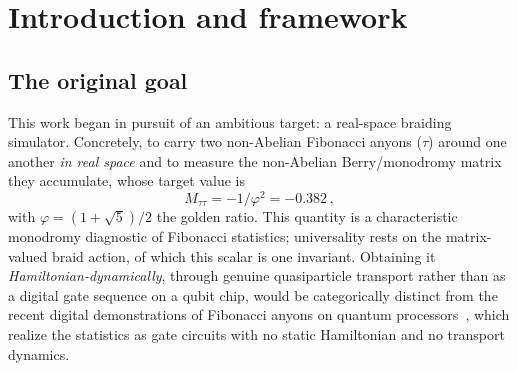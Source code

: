 \documentclass[aps,pra,twocolumn,superscriptaddress,longbibliography,floatfix,nofootinbib]{revtex4-2}
\begin{document}
\begin{abstract}
the reference error --- the distance to that analytic target, formed in a
separate scoring step, not an output of the solver.
The modular data themselves are not new with this
work --- Francuz and Dziarmaga obtained them for this model in 2020; new here
are the finite-lattice demonstration of the rotation channel, the quantified
error budget, and the measured loop-algebra limit as a concrete instance of the
Li--Mong bound. Complementing this static certificate, we show that on the
one-dimensionally mapped anyonic ladder the Hamiltonian transport of a single
mobile Ising anyon around a pinned object cannot realize the non-Abelian braid
matrix: the closed-loop holonomy is exactly the identity and
$[U(C_1),U(C_2)]=0$, established through two independent obstructions, three
null escape routes, and a machinery-alive control. That obstruction is
structural and independent of both the anyon type and the system size, so it
constrains the Fibonacci ambition motivating this work and not merely the Ising
tracer that exhibits it. Both halves were produced under an adversarial
verification harness that, in the course of this work, retracted an attribution of its own ---
crediting the lattice with the signed data before a channel existed to carry it --- and then
restored it with proof through the rotation channel. The values were never in question, only
their provenance.
\end{abstract}

\maketitle

\section{Introduction and framework}
\label{sec:intro}

\subsection{The original goal}
\label{sec:goal}

This work began in pursuit of an ambitious target: a real-space braiding
simulator. Concretely, to carry two non-Abelian Fibonacci anyons ($\tau$)
around one another \emph{in real space} and to measure the non-Abelian
Berry/monodromy matrix they accumulate, whose target value is
\begin{equation}
  M_{\tau\tau} = -1/\varphi^{2} = -0.382\,,
  \label{eq:target}
\end{equation}
with $\varphi=(1+\sqrt5)/2$ the golden ratio. This quantity is a characteristic
monodromy diagnostic of Fibonacci statistics; universality rests on the
matrix-valued braid action, of which this scalar is one invariant. Obtaining it
\emph{Hamiltonian-dynamically},
through genuine quasiparticle transport rather than as a digital gate sequence
on a qubit chip, would be categorically distinct from the recent digital
demonstrations of Fibonacci anyons on quantum processors~\cite{Xu2024}, which
realize the statistics as gate circuits with no static Hamiltonian and no
transport dynamics.
\end{document}
